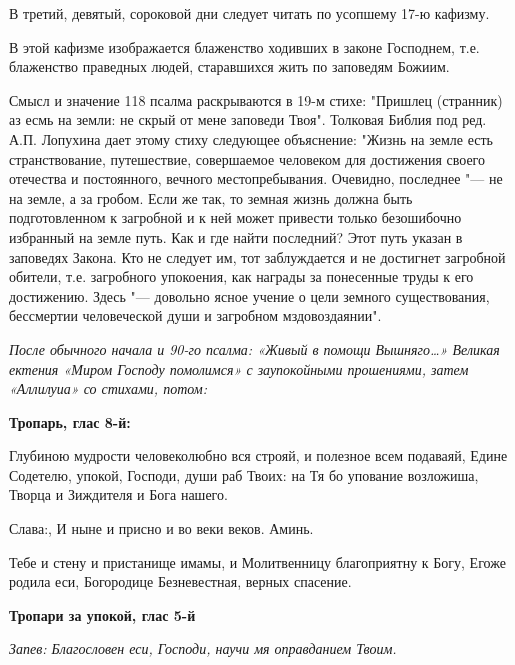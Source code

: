 В третий, девятый, сороковой дни следует читать по усопшему 17-ю кафизму. 

В этой кафизме изображается блаженство ходивших в законе Господнем, т.е. блаженство праведных людей, старавшихся жить по заповедям Божиим. 

Смысл и значение 118 псалма раскрываются в 19-м стихе: "Пришлец (странник) аз есмь на земли: не скрый от мене заповеди Твоя". Толковая Библия под ред. А.П. Лопухина дает этому стиху следующее объяснение: "Жизнь на земле есть странствование, путешествие, совершаемое человеком для достижения своего отечества и постоянного, вечного местопребывания. Очевидно, последнее "--- не на земле, а за гробом. Если же так, то земная жизнь должна быть подготовленном к загробной и к ней может привести только безошибочно избранный на земле путь. Как и где найти последний? Этот путь указан в заповедях Закона. Кто не следует им, тот заблуждается и не достигнет загробной обители, т.е. загробного упокоения, как награды за понесенные труды к его достижению. Здесь "--- довольно ясное учение о цели земного существования, бессмертии человеческой души и загробном мздовоздаянии". 

\normalfont{} 


\mychapterending

 


\itshape  После обычного начала и 90-го псалма:\normalfont{} «Живый в помощи Вышняго…»
\itshape  Великая ектения\normalfont{} «Миром Господу помолимся» \itshape  с заупокойными
прошениями, затем\normalfont{} «Аллилуиа» \itshape  со стихами, потом:\normalfont{}


 

\bfseries Тропарь, глас 8-й:\normalfont{}

   Глубиною мудрости человеколюбно вся строяй, и полезное всем подаваяй,
Едине Содетелю, упокой, Господи, души раб Твоих: на Тя бо упование
возложиша, Творца и Зиждителя и Бога нашего.


   Слава:, И ныне и присно и во веки веков. Аминь.


   Тебе и стену и пристанище имамы, и Молитвенницу благоприятну к Богу,
Егоже родила еси, Богородице Безневестная, верных спасение.


 

\bfseries Тропари за упокой, глас 5-й\normalfont{}

 \itshape Запев:\normalfont{} Благословен еси, Господи, научи мя оправданием Твоим.



